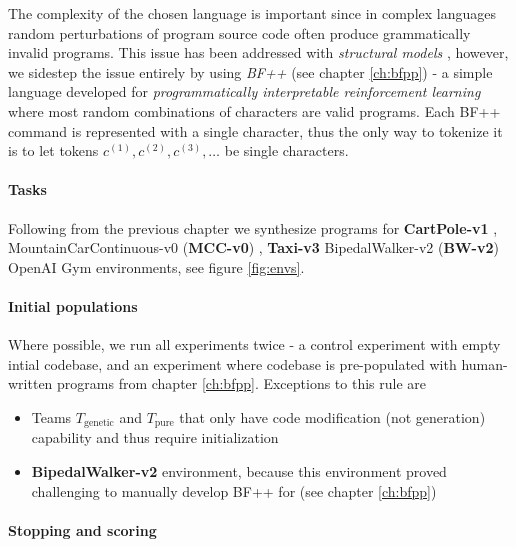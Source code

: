 
The complexity of the chosen language is important since in complex languages random perturbations of program source code often produce grammatically invalid programs.
This issue has been addressed with \emph{structural models} \cite{grammargp,structural} \cite[chapter 4]{genprog1,genprog2ast}, however, we sidestep the issue entirely by using \emph{BF++} (see chapter \ref{ch:bfpp}) - a simple language developed for \emph{programmatically interpretable reinforcement learning} where most random combinations of characters are valid programs.
Each BF++ command is represented with a single character, thus the only way to tokenize it is to let tokens $c^{(1)},c^{(2)},c^{(3)},\dots$ be single characters.

\paragraph{Tasks}
\label{sec:tasks}

Following from the previous chapter we synthesize programs for \textbf{CartPole-v1} \cite{cartpole}, MountainCarContinuous-v0 (\textbf{MCC-v0}) \cite{mountain_car}, \textbf{Taxi-v3} \cite{taxi} BipedalWalker-v2 (\textbf{BW-v2})  OpenAI Gym \cite{openai-gym} environments, see figure \ref{fig:envs}.

\paragraph{Initial populations}

Where possible, we run all experiments twice - a control experiment with empty intial codebase, and an experiment where codebase is pre-populated with human-written programs from chapter \ref{ch:bfpp}.
Exceptions to this rule are 
\begin{itemize}
    \item Teams $T_\text{genetic}$ and $T_\text{pure}$ that only have code modification (not generation) capability and thus require initialization 
    \item \textbf{BipedalWalker-v2} environment, because this environment proved challenging to manually develop BF++ for (see chapter \ref{ch:bfpp})
\end{itemize}

\paragraph{Stopping and scoring}

